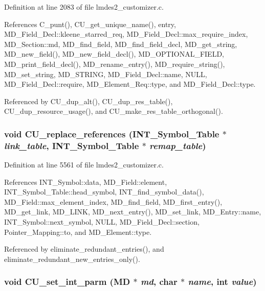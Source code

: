Definition at line 2083 of file lmdes2\_\-customizer.c.

References C\_\-punt(), CU\_\-get\_\-unique\_\-name(), entry, MD\_\-Field\_\-Decl::kleene\_\-starred\_\-req, MD\_\-Field\_\-Decl::max\_\-require\_\-index, MD\_\-Section::md, MD\_\-find\_\-field, MD\_\-find\_\-field\_\-decl, MD\_\-get\_\-string, MD\_\-new\_\-field(), MD\_\-new\_\-field\_\-decl(), MD\_\-OPTIONAL\_\-FIELD, MD\_\-print\_\-field\_\-decl(), MD\_\-rename\_\-entry(), MD\_\-require\_\-string(), MD\_\-set\_\-string, MD\_\-STRING, MD\_\-Field\_\-Decl::name, NULL, MD\_\-Field\_\-Decl::require, MD\_\-Element\_\-Req::type, and MD\_\-Field\_\-Decl::type.

Referenced by CU\_\-dup\_\-alt(), CU\_\-dup\_\-res\_\-table(), CU\_\-dup\_\-resource\_\-usage(), and CU\_\-make\_\-res\_\-table\_\-orthogonal().
\subsubsection{\setlength{\rightskip}{0pt plus 5cm}void CU\_\-replace\_\-references (\bf{INT\_\-Symbol\_\-Table} $\ast$ {\em link\_\-table}, \bf{INT\_\-Symbol\_\-Table} $\ast$ {\em remap\_\-table})}\label{lmdes2__customizer_8c_e91f10afbc8636670c067c17090d0cf3}




Definition at line 5561 of file lmdes2\_\-customizer.c.

References INT\_\-Symbol::data, MD\_\-Field::element, INT\_\-Symbol\_\-Table::head\_\-symbol, INT\_\-find\_\-symbol\_\-data(), MD\_\-Field::max\_\-element\_\-index, MD\_\-find\_\-field, MD\_\-first\_\-entry(), MD\_\-get\_\-link, MD\_\-LINK, MD\_\-next\_\-entry(), MD\_\-set\_\-link, MD\_\-Entry::name, INT\_\-Symbol::next\_\-symbol, NULL, MD\_\-Field\_\-Decl::section, Pointer\_\-Mapping::to, and MD\_\-Element::type.

Referenced by eliminate\_\-redundant\_\-entries(), and eliminate\_\-redundant\_\-new\_\-entries\_\-only().
\subsubsection{\setlength{\rightskip}{0pt plus 5cm}void CU\_\-set\_\-int\_\-parm (\bf{MD} $\ast$ {\em md}, char $\ast$ {\em name}, int {\em value})}\label{lmdes2__customizer_8c_41d97bbca3aeb3d1e569f1e822129a16}




